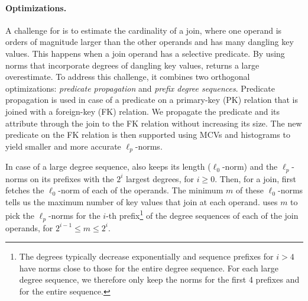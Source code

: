 \paragraph{Optimizations.} A challenge for \system is to estimate the cardinality of a join, where one operand is orders of magnitude larger than the other operands and has many dangling key values. This happens when a join operand has a selective predicate. By using norms that incorporate degrees  of dangling key values, \system returns a large overestimate. To address this challenge, it combines two orthogonal optimizations:  {\em predicate propagation} and {\em prefix degree sequences}. 
Predicate propagation is used in case of a predicate on a primary-key (PK) relation that is joined with a foreign-key (FK) relation. We propagate the predicate and its attribute through the join to the FK relation without increasing its size. The new predicate on the FK relation is then supported using MCVs and histograms to yield smaller and more accurate $\ell_p$-norms. 


In case of a large degree sequence, \system also keeps its length ($\ell_0$-norm) and the $\ell_p$-norms on its prefixes with the $2^i$ largest degrees, for $i\geq 0$. Then, for a join, \system first fetches the $\ell_0$-norm of each of the operands. The minimum $m$ of these $\ell_0$-norms tells us the maximum number of key values that join at each operand. \system uses $m$ to pick the $\ell_p$-norms for the $i$-th prefix\footnote{The degrees typically decrease exponentially and sequence prefixes for $i>4$ have norms close to those for the entire degree sequence. For each large degree sequence, we therefore only keep the norms for the first 4 prefixes and for the entire sequence.} of the degree sequences of each of the join operands, for $2^{i-1}\leq m \leq 2^i$.



